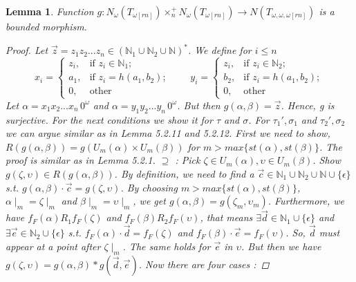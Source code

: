\documentclass[12pt, a4paper]{scrartcl}
\newtheorem{lemma}[definition]{Lemma}
\begin{document}
    \begin{lemma}
        Function $g : N_\omega(T_{\omega[rn]}) \times^+_n N_\omega(T_{\omega[rn]}) \rightarrow N(T_{\omega,\omega,\omega[rn]})$ is a bounded morphism.
        
        \begin{proof}
            Let $\vec{z} = z_1z_2...z_n \in (\mathbb{N}_{1} \cup \mathbb{N}_{2} \cup \mathbb{N})^*$. We define for $i \leq n $
        \[
            x_i = 
            \begin{cases}
            z_i, & \text{if } z_i \in \mathbb{N}_{1}; \\
            a_1, & \text{if } z_i = h(a_1,b_2); \\
            0,   & \text{other}
            \end{cases}
            \qquad
            y_i = 
            \begin{cases}
            z_i, & \text{if } z_i \in \mathbb{N}_{2}; \\
            b_2, & \text{if } z_i = h(a_1,b_2); \\
            0,   & \text{other } 
            \end{cases}
        \] 
        \newline
        Let $\alpha = x_1x_2...x_n \, 0^\omega$ and $\alpha = y_1y_2...y_n \, 0^\omega$. But then $g(\alpha,\beta) = \vec{z}$. Hence, g is surjective.
        For the next conditions we show it for $\tau$ and $\sigma$. For $\tau_1', \sigma_1$ and $\tau_2', \sigma_2$ we can argue similar as in Lemma 5.2.11 and 5.2.12.\newline
        First we need to show, $R(g(\alpha,\beta)) = g(U_m(\alpha) \times U_m(\beta))$ for $m > max\{st(\alpha), st(\beta)\}$.
        The proof is similar as in Lemma 5.2.1. \newline
        $\supseteq$ : Pick $\zeta \in U_m(\alpha), \upsilon \in U_m(\beta)$. Show $g(\zeta, \upsilon) \in R(g(\alpha,\beta))$. By definition, we need to find a $\vec{c} \in \mathbb{N}_1 \cup \mathbb{N}_2 \cup \mathbb{N} \cup \{\epsilon\}$ s.t. $g(\alpha,\beta) \cdot \vec{c} = g(\zeta, \upsilon)$.
        By choosing $m> max\{st(\alpha),st(\beta)\}$, $\alpha \mid_m = \zeta \mid_m$ and $\beta \mid_m = \upsilon \mid_m$, we get $g(\alpha,\beta) = g(\zeta_m, \upsilon_m)$. Furthermore, we have $f_F(\alpha)R_1f_F(\zeta)$ and $f_F(\beta)R_2f_F(\upsilon)$, that means $\exists \vec{d} \in \mathbb{N}_1 \cup \{\epsilon\}$ and $\exists \vec{e} \in \mathbb{N}_2 \cup \{\epsilon\}$ s.t.
        $f_F(\alpha) \cdot \vec{d} = f_F(\zeta)$ and $f_F(\beta) \cdot \vec{e} = f_F(\upsilon)$. So, $\vec{d}$ must appear at a point after $\zeta \mid_m$. The same holds for $\vec{e}$ in $\upsilon$. But then we have $g(\zeta, \upsilon) = g(\alpha,\beta) * g(\vec{d}, \vec{e})$.  \newline Now there are four cases :

\end{proof}
\end{lemma}
\end{document}
